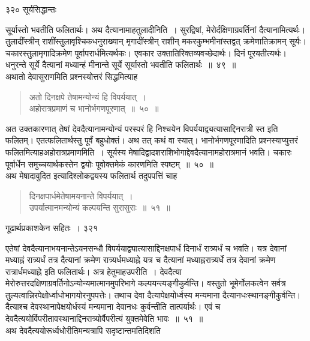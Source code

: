 \documentclass[11pt, openany]{book}
\begin{document}
\newpage


\noindent ३२० \hspace{4cm} सूर्यसिद्धान्तः
\vspace{1cm}


\noindent सूर्यास्तो भवतीति फलितार्थः। अथ दैत्यानामाह\textendash तुलादीनिति~। सुरद्विषां, मेरोर्दक्षिणाग्रवर्तिनां दैत्यानामित्यर्थः। तुलादींस्त्रीन् राशींस्तुलावृश्चिकधनुराख्यान् मृगादींस्त्रीन् राशीन् मकरकुम्भमीनांस्तद्वत् क्रमेणातिक्रामन् सूर्यः। चकारस्तुलामृगादिक्रमेण पूर्वापरार्धमित्यर्थकः। एवकार उक्तातिरिक्तव्यवच्छेदार्थः। दिनं पूरयतीत्यर्थः। धनुरन्ते सूर्ये दैत्यानां मध्यान्हं मीनान्ते सूर्ये सूर्यास्तो भवतीति फलितार्थः~॥~४९~॥\\
\noindent अथातो देवासुराणमिति प्रश्नस्योत्तरं सिद्धमित्याह\textendash 


\begin{quote}
 {\ssi अतो दिनक्षपे तेषामन्योन्यं हि विपर्ययात्~।\\
अहोरात्रप्रमाणं च भानोर्भगणपूरणात्~॥~५०~॥}
\end{quote}

 अत उक्तकारणात् तेषां देवदैत्यानामन्योन्यं परस्परं हि निश्चयेन विपर्ययाद्व्यत्यासाद्दिनरात्री स्त इति फलितम्। एतत्फलितार्थस्तु पूर्वं बहुधोक्तं। अथ तत् कथं वा स्यात्। भानोर्भगणपूरणादिति प्रश्नस्याप्युत्तरं फलितमित्याह\textendash अहोरात्रप्रमाणमिति~। सूर्यस्य मेषादिद्वादशराशिभोगाद्देवदैत्यानामहोरात्रमानं भवति। चकारः पूर्वार्धेन समुच्चयार्थकस्तेन द्वयोः पूवोक्तमेकं कारणमिति स्पष्टम्~॥~५०~॥\\ 
\noindent अथ मेषादावुदित इत्यादिश्लोकद्वयस्य फलितार्थ तदुपपत्तिं चाह\textendash


\begin{quote}
 {\ssi दिनक्षपार्धमेतेषामयनान्ते विपर्ययात्~।\\
उपर्यात्मानमन्योन्यं कल्पयन्ति सुरासुराः~॥~५१~॥}
\end{quote}



\newpage


\hspace{3cm} गूढार्थप्रकाशकेन सहितः~। \hfill ३२१
\vspace{1cm}


 एतेषां देवदैत्यानाभयनान्तेऽयनसन्धौ विपर्ययाद्व्यात्यासाद्दिनक्षपार्धं दिनार्धं रात्र्यर्धं च भवति। यत्र देवानां मध्याह्नं रात्र्यर्धं तत्र दैत्यानां क्रमेण रात्र्यर्धमध्याह्ने यत्र च दैत्यानां मध्याह्नरात्र्यर्धे तत्र देवानां क्रमेण रात्रार्धमध्याह्ने इति फलितार्थः। अत्र हेतुमाह\textendash उपरीति~। देवदैत्या मेरोरुत्तरदक्षिणाग्रवर्तिनोऽन्योन्यमात्मानमुपरिभागे कल्पयन्त्यङ्गीकुर्वन्ति। वस्तुतो भूमेर्गोलकत्वेन सर्वत्र तुल्यत्वान्निरपेक्षोर्ध्वाधोभागयोरनुपपत्तेः। तथाच देवा दैत्यापेक्षयोर्ध्वस्य मन्यमाना दैत्यानधःस्थानङ्गीकुर्वन्ति। दैत्याश्च देवस्थानापेक्षयोर्धस्यं मन्यमाना देवानधः कुर्वन्तीति तात्पर्यार्थः। एवं च देवदैत्ययोर्विपरीतावस्थानाद्दिनरात्र्योर्वैपरीत्यं युक्तमेवेति भावः~॥~५१~॥ \\
\noindent अथ देवदैत्ययोरूर्ध्वधोरीतिमन्यत्रापि सदृष्टान्तमतिदिशति\textendash 
\end{document}
